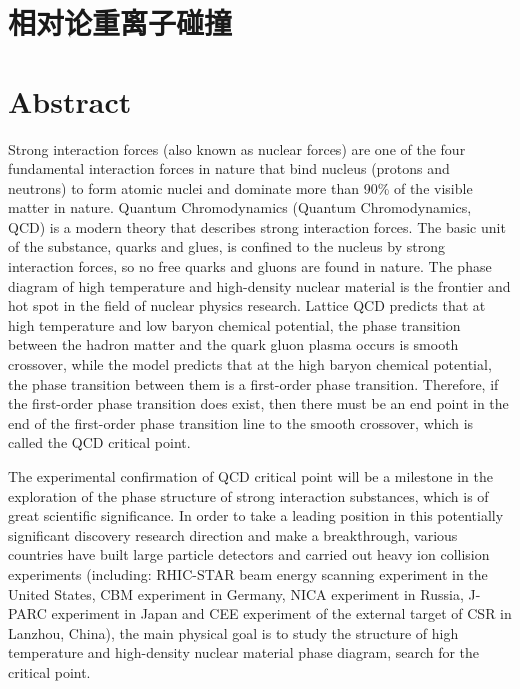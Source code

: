 

\setcounter{section}{0}



\chapter{相对论重离子碰撞}

\setcounter{figure}{0}
\setcounter{table}{0}
\setcounter{equation}{0}

\chapter*{Abstract}



Strong interaction forces (also known as nuclear forces) are one of the four fundamental interaction forces in nature that bind nucleus (protons and neutrons) to form atomic nuclei and dominate more than 90\% of the visible matter in nature. 
Quantum Chromodynamics (Quantum Chromodynamics, QCD) is a modern theory that describes strong interaction forces. The basic unit of the substance, quarks and glues, is confined to the nucleus by strong interaction forces, so no free quarks and gluons are found in nature. The phase diagram of high temperature and high-density nuclear material is the frontier and hot spot in the field of nuclear physics research.
Lattice QCD predicts that at high temperature and low baryon chemical potential, the phase transition between the hadron matter and the quark gluon plasma occurs  is smooth crossover, while the model predicts that at the high baryon chemical potential, the phase transition between them is a first-order phase transition.  Therefore, if the first-order phase transition does exist, then there must be an end point in the end of the first-order phase transition line to the smooth crossover, which is called the QCD critical point. 

The experimental confirmation of QCD critical point will be a milestone in the exploration of the phase structure of strong interaction substances, which is of great scientific significance. In order to take a leading position in this potentially significant discovery research direction and make a breakthrough, various countries have built large particle detectors and carried out heavy ion collision experiments (including: RHIC-STAR beam energy scanning experiment in the United States, CBM experiment in Germany, NICA experiment in Russia, J-PARC experiment in Japan and CEE experiment of the external target of CSR in Lanzhou, China), the main physical goal is to study the structure of high temperature and high-density nuclear material phase diagram, search for the critical point.

